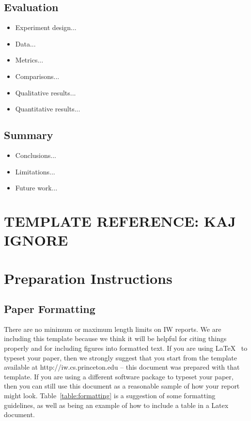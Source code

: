 \documentclass[pageno]{jpaper}
\begin{document}
\subsection{Evaluation}
\begin{itemize}
	\item Experiment design...
	\item Data...
	\item Metrics...
	\item Comparisons...
	\item Qualitative results...
	\item Quantitative results...
\end{itemize}

\subsection{Summary}
\begin{itemize}
	\item Conclusions...
	\item Limitations...
	\item Future work...
\end{itemize}








\section{TEMPLATE REFERENCE: KAJ IGNORE}
\section{Preparation Instructions}

\subsection{Paper Formatting}
\label{section:formatting}

There are no minimum or maximum length limits on IW reports.  
We are including this template because we think it will be helpful
for citing things properly and for including figures into formatted
text.  If you are using \LaTeX~\cite{lamport94} 
to typeset your paper, then we strongly suggest
that you start from the template available at
http://iw.cs.princeton.edu -- this
document was prepared with that template.  
If you are using a different software package to typeset your paper, 
then you can still use this document as a reasonable sample of 
how your report might look.  Table~\ref{table:formatting} is a suggestion
of some formatting guidelines, as well as being an example of how to
include a table in a Latex document.
\end{document}
